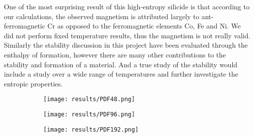 One of the most surprising result of this high-entropy silicide is that according to our calculations, the observed magnetism is attributed largely to ant-ferromagnetic Cr as opposed to the ferromagnetic elements Co, Fe and Ni. We did not perform fixed temperature results, thus the magnetism is not really valid. Similarly the stability discussion in this project have been evaluated through the enthalpy of formation, however there are many other contributions to the stability and formation of a material. And a true study of the stability would include a study over a wide range of temperatures and further investigate the entropic properties.  

\newpage

\begin{figure}[H]
\begin{subfigure}{\textwidth}
\texttt{[image: results/PDF48.png]}
\end{subfigure}
\begin{subfigure}{\textwidth}
\texttt{[image: results/PDF96.png]}
\end{subfigure}
\begin{subfigure}{\textwidth}
\texttt{[image: results/PDF192.png]}
\end{subfigure}
\end{figure}

\newpage


